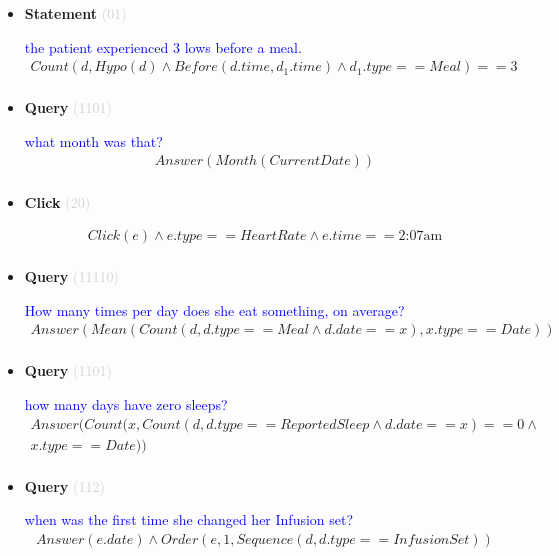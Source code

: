 \documentclass[11pt]{article}
\newcommand{\key}[1]{\textcolor{lightgray}{#1}}
\newcounter{CQuery}
\newcounter{CStatement}
\newcounter{CClick}
\begin{document}
\begin{itemize}
\item
\textbf{Statement\theCStatement} \key{(01)} \addtocounter{CStatement}{1}
\textcolor{blue}{ the patient experienced 3 lows before a meal. }
\begin{multline*}
Count(d, Hypo(d) \wedge Before(d.time, d_1.time) \wedge d_1.type==Meal)==3 \\ 
\end{multline*}


\item
\textbf{Query\theCQuery} \key{(1101)} \addtocounter{CQuery}{1}
\textcolor{blue}{ what month was that? }
\begin{multline*}
Answer(Month(CurrentDate)) \\ 
\end{multline*}


\item
\textbf{Click\theCClick} \key{(20)} \addtocounter{CClick}{1}
\textcolor{blue}{  }
\begin{multline*}
Click(e) \wedge e.type==HeartRate \wedge e.time==\mbox{2:07am} \\ 
\end{multline*}


\item
\textbf{Query\theCQuery} \key{(11110)} \addtocounter{CQuery}{1}
\textcolor{blue}{ How many times per day does she eat something, on average? }
\begin{multline*}
Answer(Mean(Count(d, d.type==Meal \wedge d.date==x), x.type==Date)) \\ 
\end{multline*}


\item
\textbf{Query\theCQuery} \key{(1101)} \addtocounter{CQuery}{1}
\textcolor{blue}{ how many days have zero sleeps? }
\begin{multline*}
Answer(Count(x, Count(d, d.type==ReportedSleep \wedge d.date==x)==0 \wedge \\ 
x.type==Date)) \\ 
\end{multline*}


\item
\textbf{Query\theCQuery} \key{(112)} \addtocounter{CQuery}{1}
\textcolor{blue}{ when was the first time she changed her Infusion set? }
\begin{multline*}
Answer(e.date) \wedge Order(e, 1, Sequence(d, d.type==InfusionSet)) \\ 
\end{multline*}



\end{itemize}
\end{document}
